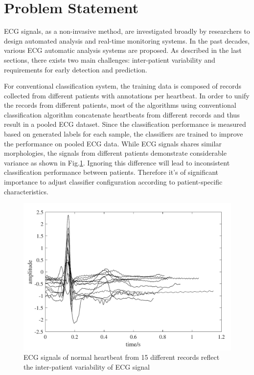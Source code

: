 
\section{Problem Statement}

ECG signals, as a non-invasive method, are investigated broadly by researchers to design automated analysis and real-time monitoring systems. In the past decades, various ECG automatic analysis systems are proposed. As described in the last sections, there exists two main challenges: inter-patient variability and requirements for early detection and prediction. %

For conventional classification system, the training data is composed of records collected from different patients with annotations per heartbeat. In order to unify the records from different patients, most of the algorithms using conventional classification algorithm concatenate heartbeats from different records and thus result in a pooled ECG dataset. Since the classification performance is measured based on generated labels for each sample, the classifiers are trained to improve the performance on pooled ECG data. While ECG signals shares similar morphologies, the signals from different patients demonstrate considerable variance as shown in Fig.\ref{fig:interpatient_variability}. Ignoring this difference will lead to inconsistent classification performance between patients. Therefore it's of significant importance to adjust classifier configuration according to patient-specific characteristics.  %

 \begin{figure}[thpb]
 	\centering
 	\includegraphics[scale=0.7]{Fig/interpatient_variability.pdf}
 	\caption{ECG signals of normal heartbeat from 15 different records reflect the inter-patient variability of ECG signal}
 	\label{fig:interpatient_variability}
 \end{figure}

